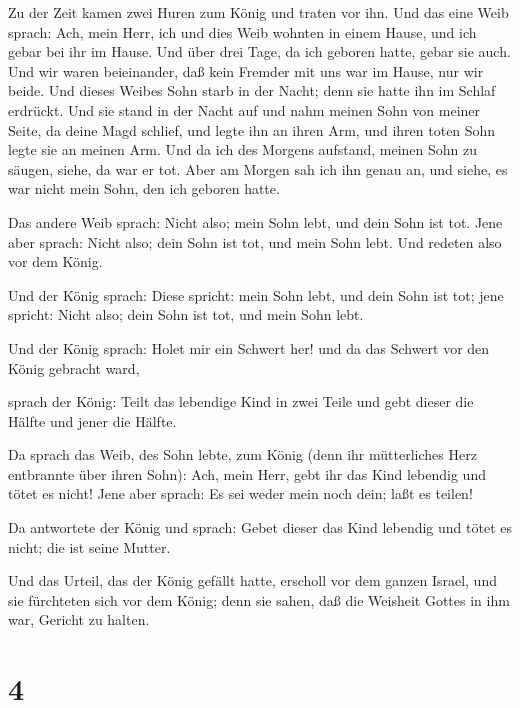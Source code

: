  Zu der Zeit kamen zwei Huren zum König und traten vor ihn.
 Und das eine Weib sprach: Ach, mein Herr, ich und dies
Weib wohnten in einem Hause, und ich gebar bei ihr im Hause.
 Und über drei Tage, da ich geboren hatte, gebar sie auch.
Und wir waren beieinander, daß kein Fremder mit uns war im Hause, nur
wir beide.  Und dieses Weibes Sohn starb in der Nacht; denn
sie hatte ihn im Schlaf erdrückt.  Und sie stand in der
Nacht auf und nahm meinen Sohn von meiner Seite, da deine Magd schlief,
und legte ihn an ihren Arm, und ihren toten Sohn legte sie an meinen
Arm.  Und da ich des Morgens aufstand, meinen Sohn zu
säugen, siehe, da war er tot. Aber am Morgen sah ich ihn genau an, und
siehe, es war nicht mein Sohn, den ich geboren hatte.

 Das andere Weib sprach: Nicht also; mein Sohn lebt, und
dein Sohn ist tot. Jene aber sprach: Nicht also; dein Sohn ist tot, und
mein Sohn lebt. Und redeten also vor dem König.

 Und der König sprach: Diese spricht: mein Sohn lebt, und
dein Sohn ist tot; jene spricht: Nicht also; dein Sohn ist tot, und mein
Sohn lebt.

 Und der König sprach: Holet mir ein Schwert her! und da
das Schwert vor den König gebracht ward,

 sprach der König: Teilt das lebendige Kind in zwei Teile
und gebt dieser die Hälfte und jener die Hälfte.

 Da sprach das Weib, des Sohn lebte, zum König (denn ihr
mütterliches Herz entbrannte über ihren Sohn): Ach, mein Herr, gebt ihr
das Kind lebendig und tötet es nicht! Jene aber sprach: Es sei weder
mein noch dein; laßt es teilen!

 Da antwortete der König und sprach: Gebet dieser das Kind
lebendig und tötet es nicht; die ist seine Mutter.

 Und das Urteil, das der König gefällt hatte, erscholl vor
dem ganzen Israel, und sie fürchteten sich vor dem König; denn sie
sahen, daß die Weisheit Gottes in ihm war, Gericht zu halten.

\hypertarget{section-3}{%
\section{4}\label{section-3}}

